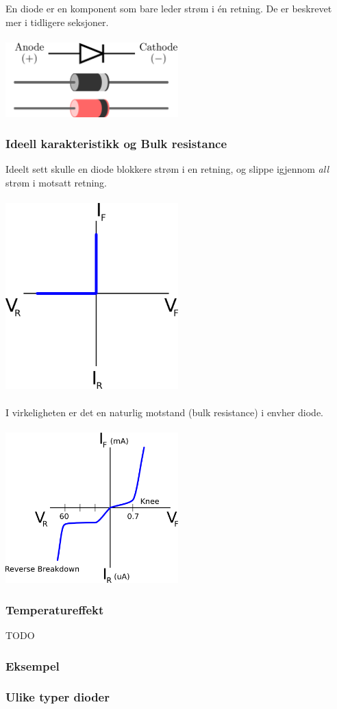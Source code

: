 En diode er en komponent som bare leder strøm i én retning.
De er beskrevet mer i tidligere seksjoner.
\\\\
\includegraphics[width=0.5\textwidth]{./img/dioder}

\subsubsection{Ideell karakteristikk og Bulk resistance}
Ideelt sett skulle en diode blokkere strøm i en retning,
og slippe igjennom \emph{all} strøm i motsatt retning.
\\\\
\includegraphics[width=0.5\textwidth]{./img/diodestrom}
\\\\
I virkeligheten er det en naturlig motstand
(bulk resistance) i envher diode.
\\\\
\includegraphics[width=0.5\textwidth]{./img/diodereell}

\subsubsection{Temperatureffekt}
TODO

\subsubsection{Eksempel}


\subsubsection{Ulike typer dioder}

